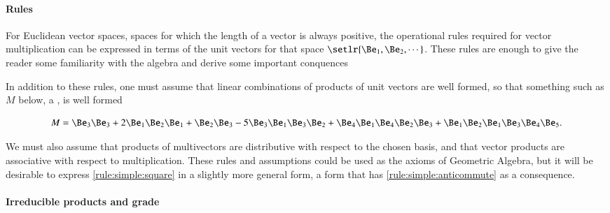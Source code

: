\paragraph{Rules}

For Euclidean vector spaces, spaces for which the length of a vector is always positive, the operational rules required for vector multiplication can be expressed in terms of the unit vectors for that space \( \setlr{ \Be_1, \Be_2, \cdots } \).  These rules are enough to give the reader some familiarity with the algebra and derive some important conquences



In addition to these rules, one must assume that linear combinations of products of unit vectors are well formed, so that something such as \( M \) below, a , is well formed

\begin{equation}\label{eqn:SimpleProducts:20}
M = \Be_3 \Be_3 + 2 \Be_1 \Be_2 \Be_1 + \Be_2 \Be_3 - 5 \Be_3 \Be_1 \Be_3 \Be_2 + \Be_4 \Be_1 \Be_4 \Be_2 \Be_3 + \Be_1 \Be_2 \Be_1 \Be_3 \Be_4 \Be_5.
\end{equation}

We must also assume that products of multivectors are distributive with respect to the chosen basis, and that vector products are associative with respect to multiplication.  These rules and assumptions could be used as the axioms of Geometric Algebra, but it will be desirable to express \ref{rule:simple:square} in a slightly more general form, a form that has \ref{rule:simple:anticommute} as a consequence.

\paragraph{Irreducible products and grade}

